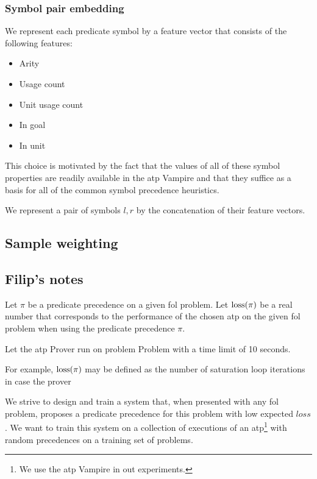\subsubsection{Symbol pair embedding}

We represent each predicate symbol by a feature vector that consists of the following features:

\begin{itemize}
	\item Arity
	\item Usage count
	\item Unit usage count
	\item In goal
	\item In unit
\end{itemize}

This choice is motivated by the fact that the values of all of these symbol properties
are readily available in the \gls{atp} Vampire
and that they suffice as a basis for all of the common symbol precedence heuristics.

We represent a pair of symbols \(l, r\) by the concatenation of their feature vectors.

\subsection{Sample weighting}


\subsection{Filip's notes}

Let \(\pi\) be a predicate precedence on a given \gls{fol} problem.
Let \(\operatorname{loss}(\pi)\) be a real number that corresponds to the performance of the chosen \gls{atp}
on the given \gls{fol} problem when using the predicate precedence \(\pi\).

Let the \gls{atp} Prover run on problem Problem with a time limit of 10 seconds.


For example, \(\operatorname{loss}(\pi)\) may be defined as the number of saturation loop iterations in case the prover

We strive to design and train a system that, when presented with any \gls{fol} problem,
proposes a predicate precedence for this problem with low expected \(loss\).
We want to train this system on a collection of executions of an \gls{atp}\footnote{We use the \gls{atp} Vampire in out experiments.} with random precedences on a training set of problems.

